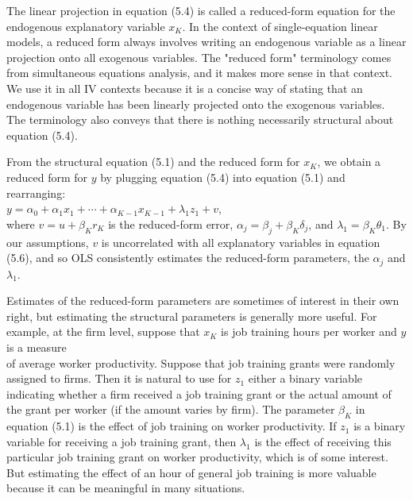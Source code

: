 \documentclass[10pt]{article}
\begin{document}
The linear projection in equation (5.4) is called a reduced-form equation for the endogenous explanatory variable $x_{K}$. In the context of single-equation linear models, a reduced form always involves writing an endogenous variable as a linear projection onto all exogenous variables. The "reduced form" terminology comes from simultaneous equations analysis, and it makes more sense in that context. We use it in all IV contexts because it is a concise way of stating that an endogenous variable has been linearly projected onto the exogenous variables. The terminology also conveys that there is nothing necessarily structural about equation (5.4).

From the structural equation (5.1) and the reduced form for $x_{K}$, we obtain a reduced form for $y$ by plugging equation (5.4) into equation (5.1) and rearranging:\\
$y=\alpha_{0}+\alpha_{1} x_{1}+\cdots+\alpha_{K-1} x_{K-1}+\lambda_{1} z_{1}+v$,\\
where $v=u+\beta_{K} r_{K}$ is the reduced-form error, $\alpha_{j}=\beta_{j}+\beta_{K} \delta_{j}$, and $\lambda_{1}=\beta_{K} \theta_{1}$. By our assumptions, $v$ is uncorrelated with all explanatory variables in equation (5.6), and so OLS consistently estimates the reduced-form parameters, the $\alpha_{j}$ and $\lambda_{1}$.

Estimates of the reduced-form parameters are sometimes of interest in their own right, but estimating the structural parameters is generally more useful. For example, at the firm level, suppose that $x_{K}$ is job training hours per worker and $y$ is a measure\\
of average worker productivity. Suppose that job training grants were randomly assigned to firms. Then it is natural to use for $z_{1}$ either a binary variable indicating whether a firm received a job training grant or the actual amount of the grant per worker (if the amount varies by firm). The parameter $\beta_{K}$ in equation (5.1) is the effect of job training on worker productivity. If $z_{1}$ is a binary variable for receiving a job training grant, then $\lambda_{1}$ is the effect of receiving this particular job training grant on worker productivity, which is of some interest. But estimating the effect of an hour of general job training is more valuable because it can be meaningful in many situations.
\end{document}
